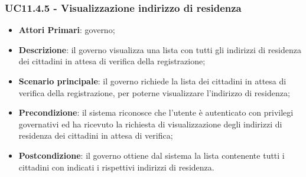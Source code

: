 \subsubsection{UC11.4.5 - Visualizzazione indirizzo di residenza}
\begin{itemize}
	\item \textbf{Attori Primari}: governo;
	\item \textbf{Descrizione}: il governo visualizza una lista con tutti gli indirizzi di residenza dei cittadini in attesa di verifica della registrazione;
	\item \textbf{Scenario principale}: il governo richiede la lista dei cittadini in attesa di verifica della registrazione, per poterne visualizzare l'indirizzo di residenza;
	\item \textbf{Precondizione}: il sistema riconosce che l'utente è autenticato con privilegi governativi ed ha ricevuto la richiesta di visualizzazione degli indirizzi di residenza dei cittadini in attesa di verifica;
	\item \textbf{Postcondizione}: il governo ottiene dal sistema la lista contenente tutti i cittadini con indicati i rispettivi indirizzi di residenza.
\end{itemize}